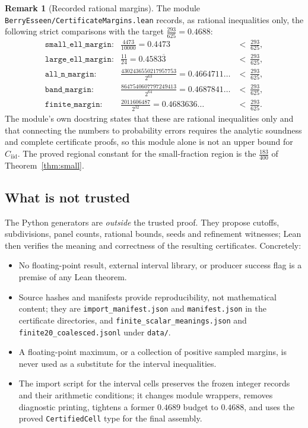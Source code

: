\documentclass[10pt,a4paper]{article}
\theoremstyle{plain}
\theoremstyle{definition}
\newtheorem{remark}[theorem]{Remark}
\newcommand{\Cii}{C_{\mathrm{iid}}}
\newcommand{\lean}[1]{\texttt{#1}}
\newcommand{\file}[1]{\texttt{#1}}
\begin{document}
\begin{remark}[Recorded rational margins]
The module \file{BerryEsseen/CertificateMargins.lean} records, as rational
inequalities only, the following strict comparisons with the target
$\tfrac{293}{625}=0.4688$:
\[
  \begin{array}{lll}
    \lean{small\_ell\_margin}: & \tfrac{4473}{10000} = 0.4473 & <\ \tfrac{293}{625},\\
    \lean{large\_ell\_margin}: & \tfrac{11}{24} = 0.4583\overline3 & <\ \tfrac{293}{625},\\
    \lean{all\_n\_margin}: & \tfrac{4302436550217957753}{2^{63}} = 0.4664711\ldots & <\ \tfrac{293}{625},\\
    \lean{band\_margin}: & \tfrac{8647540607797249413}{2^{64}} = 0.4687841\ldots & <\ \tfrac{293}{625},\\
    \lean{finite\_margin}: & \tfrac{2011606487}{2^{32}} = 0.4683636\ldots & <\ \tfrac{293}{625}.
  \end{array}
\]
The module's own docstring states that these are rational inequalities only and
that connecting the numbers to probability errors requires the analytic
soundness and complete certificate proofs, so this module alone is not an upper
bound for $\Cii$. The proved regional constant for the small-fraction region is
the $\tfrac{183}{400}$ of Theorem~\ref{thm:small}.
\end{remark}

\subsection{What is not trusted}

The Python generators are \emph{outside} the trusted proof. They propose
cutoffs, subdivisions, panel counts, rational bounds, seeds and refinement
witnesses; Lean then verifies the meaning and correctness of the resulting
certificates. Concretely:
\begin{itemize}[leftmargin=2.2em]
\item No floating-point result, external interval library, or producer success
  flag is a premise of any Lean theorem.
\item Source hashes and manifests provide reproducibility, not mathematical
  content; they are \file{import\_manifest.json} and \file{manifest.json} in
  the certificate directories, and \file{finite\_scalar\_meanings.json} and
  \file{finite20\_coalesced.jsonl} under \file{data/}.
\item A floating-point maximum, or a collection of positive sampled margins, is
  never used as a substitute for the interval inequalities.
\item The import script for the interval cells preserves the frozen integer
  records and their arithmetic conditions; it changes module wrappers, removes
  diagnostic printing, tightens a former $0.4689$ budget to $0.4688$, and uses
  the proved \lean{CertifiedCell} type for the final assembly.
\end{itemize}
\end{document}
